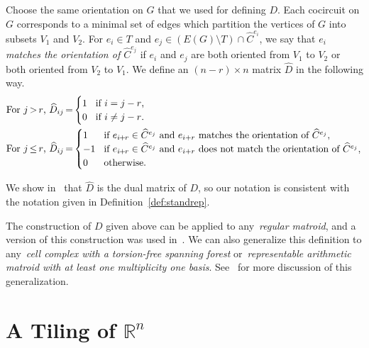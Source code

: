 \documentclass[ALCO,ThmDefs,Unicode,epreuves]{cedram}
\newcommand{\R}{\mathbb{R}}
\newcommand{\what}{\widehat}
\newcommand*{\mk}{\mkern -1mu}
\newcommand*{\Mk}{\mkern -2mu}
\begin{document}
Choose the same orientation on $G$ that we used for defining $D$. Each cocircuit on $G$ corresponds to a minimal set of edges which partition the vertices of $G$ into subsets $V_1$ and $V_2$. For $e_i \in T$ and $e_j \in (E(G) \setminus T)\cap \what C^{e_i}$, we say that \emph{$e_i$ matches the orientation of $\what C^{e_j}$} if $e_i$ and $e_j$ are both oriented from $V_1$ to $V_2$ or both oriented from $V_2$ to $V_1$. We define an $(n-r) \times n$ matrix $\what D$ in the following way. 
\[
\begin{aligned}
&\text{For $j \Mk > \Mk r$, }\what D_{ij} \Mk = \Mk \begin{cases}
1 & \Mk \text{if $i=j-r$,}\\
0 & \Mk \text{if $i\not= j-r$.}
\end{cases}
\\
&\text{For $j\Mk \le \Mk r$, }\what D_{ij} \Mk = \Mk \begin{cases}
1 & \Mk \text{if $e_{i\mk +\mk r} \in \what C^{e_j}$ and $e_{i+r}$ matches the orientation of $\what C^{e_j}$,}\\
-1 & \Mk \text{if $e_{i\mk +\mk r} \in \what C^{e_j}$ and $e_{i+r}$ does not match the orientation of $\what C^{e_j}$,}\\
0 & \Mk \text{otherwise.}\\
\end{cases}
\end{aligned}
\]

We show in~\cite[Lemma~4.5.12]{mythesis} that $\what D$ is the dual matrix of $D$, so our notation is consistent with the notation given in Definition~\ref{def:standrep}. 

\begin{rema}
The construction of $D$ given above can be applied to any~\emph{regular matroid}, and a version of this construction was used in~\cite{BBY}. We can also generalize this definition to any~\emph{cell complex with a torsion-free spanning forest} or~\emph{representable arithmetic matroid with at least one multiplicity one basis}. See~\cite[Chapter~4--6]{mythesis} for more discussion of this generalization. 
\end{rema}

\section{A Tiling of \texorpdfstring{$\R^n$}{Rn}}\label{sec:tiling}
\end{document}
